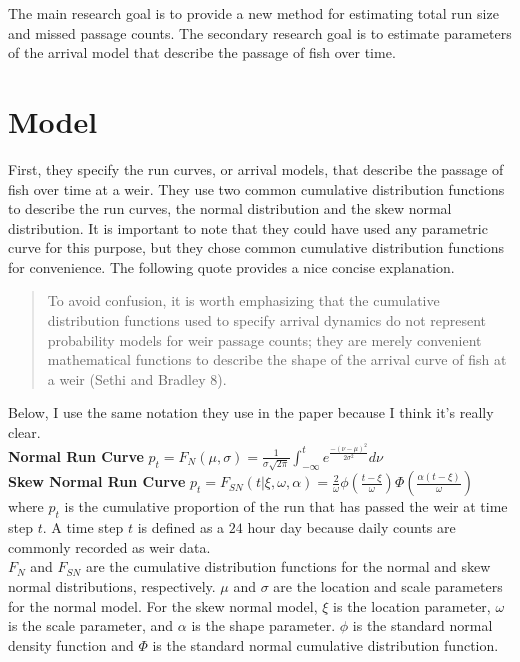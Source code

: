 \documentclass[12pt]{article}\usepackage[]{graphicx}\usepackage[]{color}
\begin{document}
\noindent The main research goal is to provide a new method for estimating total run size and missed passage counts. The secondary research goal is to estimate parameters of the arrival model that describe the passage of fish over time.


\section{Model}

First, they specify the run curves, or arrival models, that describe the passage of fish over time at a weir. They use two common cumulative distribution functions to describe the run curves, the normal distribution and the skew normal distribution. It is important to note that they could have used any parametric curve for this purpose, but they chose common cumulative distribution functions for convenience. The following quote provides a nice concise explanation.
\begin{quote}
To avoid confusion, it is worth emphasizing that the cumulative distribution functions used to specify arrival dynamics do not represent probability models for weir passage counts; they are merely convenient mathematical functions to describe the shape of the arrival curve of fish at a weir (Sethi and Bradley 8).
\end{quote}

\noindent Below, I use the same notation they use in the paper because I think it's really clear. \\

{\bf Normal Run Curve}  \hfill $p_t = F_N(\mu, \sigma) = \frac{1}{\sigma\sqrt{2\pi}} \int_{-\infty}^t e^{\frac{-(\nu - \mu)^2}{2\sigma^2}}d\nu$ \\

{\bf Skew Normal Run Curve} \hfill $p_t = F_{SN}(t|\xi, \omega, \alpha) = \frac{2}{\omega}\phi(\frac{t-\xi}{\omega}) \Phi(\frac{\alpha(t-\xi)}{\omega})$ \\

\noindent where $p_t$ is the cumulative proportion of the run that has passed the weir at time step $t$. A time step $t$ is defined as a $24$ hour day because daily counts are commonly recorded as weir data. \\

\noindent $F_N$ and $F_{SN}$ are the cumulative distribution functions for the normal and skew normal distributions, respectively. $\mu$ and $\sigma$ are the location and scale parameters for the normal model. For the skew normal model, $\xi$ is the location parameter, $\omega$ is the scale parameter, and $\alpha$ is the shape parameter. $\phi$ is the standard normal density function and $\Phi$ is the standard normal cumulative distribution function.\\
\end{document}
